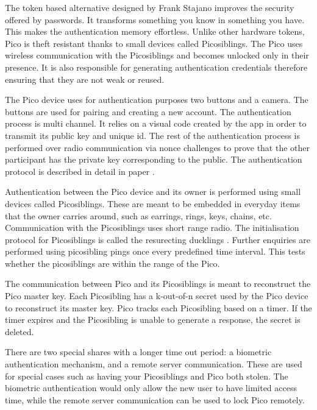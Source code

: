 The token based alternative designed by Frank Stajano improves the security offered by passwords. It transforms something you know in something you have. This makes the authentication memory effortless. Unlike other hardware tokens, Pico is theft resistant thanks to small devices called Picosiblings. The Pico uses wireless communication with the Picosiblings and becomes unlocked only in their presence. It is also responsible for generating authentication credentials therefore ensuring that they are not weak or reused.

The Pico device uses for authentication purposes two buttons and a camera. The buttons are used for pairing and creating a new account. The authentication process is multi channel. It relies on a visual code created by the app in order to transmit its public key and unique id. The rest of the authentication process is performed over radio communication via nonce challenges to prove that the other participant has the private key corresponding to the public. The authentication protocol is described in detail in paper \cite{stajano2011pico}.

Authentication between the Pico device and its owner is performed using small devices called Picosiblings. These are meant to be embedded in everyday items that the owner carries around, such as earrings, rings, keys, chains, etc. Communication with the Picosiblings uses short range radio. The initialisation protocol for Picosiblings is called the resurecting ducklings \cite{stajano2000resurrecting}. Further enquiries are performed using picosibling pings once every predefined time interval. This tests whether the picosiblings are within the range of the Pico.

The communication between Pico and its Picosiblings is meant to reconstruct the Pico master key. Each Picosibling has a k-out-of-n secret used by the Pico device to reconstruct its master key. Pico tracks each Picosibling based on a timer. If the timer expires and the Picosibling is unable to generate a response, the secret is deleted. 

There are two special shares with a longer time out period: a biometric authentication mechanism, and a remote server communication. These are used for special cases such as having your Picosiblings and Pico both stolen. The biometric authentication would only allow the new user to have limited access time, while the remote server communication can be used to lock Pico remotely.

